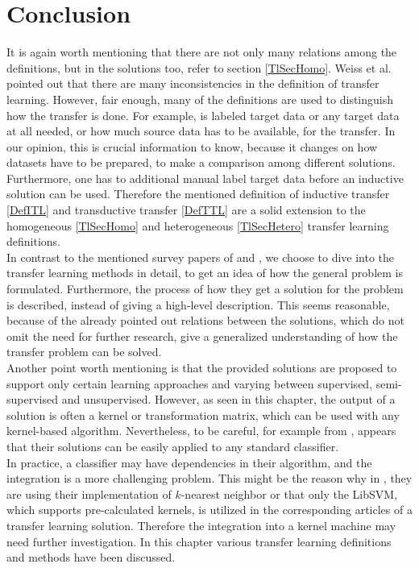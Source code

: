 \section{Conclusion}
It is again worth mentioning that there are not only many relations among the definitions, but in the solutions too, refer to section \ref{TlSecHomo}.
Weiss et al. pointed out that there are many inconsistencies in the definition of transfer learning.\cite[p. 5-6]{Weiss.2016}
However, fair enough, many of the definitions are used to distinguish how the transfer is done.
For example, is labeled target data or any target data at all needed, or how much source data has to be available, for the transfer.
In our opinion, this is crucial information to know, because it changes on how datasets have to be prepared, to make a comparison among different solutions.
Furthermore, one has to additional manual label target data before an inductive solution can be used.
Therefore the mentioned definition of inductive transfer \ref{DefITL} and transductive transfer \ref{DefTTL} are a solid extension to the homogeneous \ref{TlSecHomo} and heterogeneous \ref{TlSecHetero} transfer learning definitions.\\
In contrast to the mentioned survey papers of \cite{Weiss.2016} and \cite{Pan.2010}, we choose to dive into the transfer learning methods in detail, to get an idea of how the general problem is formulated.
Furthermore, the process of how they get a solution for the problem is described, instead of giving a high-level description.
This seems reasonable, because of the already pointed out relations between the solutions, which do not omit the need for further research, give a generalized understanding of how the transfer problem can be solved.\\
Another point worth mentioning is that the provided solutions are proposed to support only certain learning approaches and varying between supervised, semi-supervised and unsupervised.
However, as seen in this chapter, the output of a solution is often a kernel or transformation matrix, which can be used with any kernel-based algorithm.
Nevertheless, to be careful, for example from \cite{Long.}, \cite{Long.2015} \cite{Gong.} appears that their solutions can be easily applied to any standard classifier.\\
In practice, a classifier may have dependencies in their algorithm, and the integration is a more challenging problem.
This might be the reason why in \cite{Gong.}, they are using their implementation of $k$-nearest neighbor or that only the LibSVM, which supports pre-calculated kernels, is utilized in the corresponding articles of a transfer learning solution. 
Therefore the integration into a kernel machine may need further investigation.
In this chapter various transfer learning definitions and methods have been discussed.